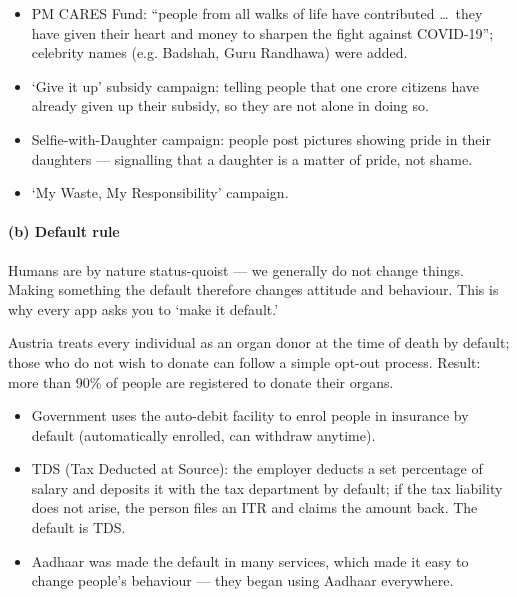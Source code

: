 \begin{GovtPolicy}
\begin{itemize}
\item PM CARES Fund: ``people from all walks of life have contributed \ldots\ they have given their heart and money to sharpen the fight against COVID-19''; celebrity names (e.g. Badshah, Guru Randhawa) were added.
\item `Give it up' subsidy campaign: telling people that one crore citizens have already given up their subsidy, so they are not alone in doing so.
\item Selfie-with-Daughter campaign: people post pictures showing pride in their daughters --- signalling that a daughter is a matter of pride, not shame.
\item `My Waste, My Responsibility' campaign.
\end{itemize}
\end{GovtPolicy}

\paragraph{(b) Default rule} Humans are by nature status-quoist --- we generally do not change things. Making something the default therefore changes attitude and behaviour. This is why every app asks you to `make it default.'

\begin{DataFact}
Austria treats every individual as an organ donor at the time of death by default; those who do not wish to donate can follow a simple opt-out process. Result: more than 90\% of people are registered to donate their organs.
\end{DataFact}

\begin{GovtPolicy}
\begin{itemize}
\item Government uses the auto-debit facility to enrol people in insurance by default (automatically enrolled, can withdraw anytime).
\item TDS (Tax Deducted at Source): the employer deducts a set percentage of salary and deposits it with the tax department by default; if the tax liability does not arise, the person files an ITR and claims the amount back. The default is TDS.
\item Aadhaar was made the default in many services, which made it easy to change people's behaviour --- they began using Aadhaar everywhere.
\end{itemize}
\end{GovtPolicy}


